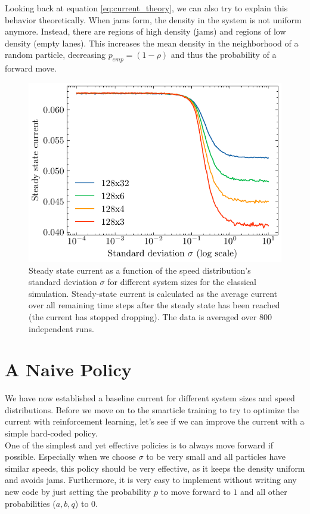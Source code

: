 Looking back at equation \ref{eq:current_theory}, we can also try to explain this behavior theoretically. When jams form, the density in the system is not uniform anymore. Instead, there are regions of high density (jams) and regions of low density (empty lanes). This increases the mean density in the neighborhood of a random particle, decreasing $p_{emp}=(1-\rho)$ and thus the probability of a forward move.  

\begin{figure}[H]
    \centering
    \includegraphics{steady_state_current_sizes_log.pdf}
    \caption{Steady state current as a function of the speed distribution's standard deviation $\sigma$ for different system sizes for the classical simulation. Steady-state current is calculated as the average current over all remaining time steps after the steady state has been reached (the current has stopped dropping). The data is averaged over 800 independent runs.}
    \label{fig:steady_state_current_sizes_log}
\end{figure}

\section{A Naive Policy}
We have now established a baseline current for different system sizes and speed distributions. Before we move on to the smarticle training to try to optimize the current with reinforcement learning, let's see if we can improve the current with a simple hard-coded policy. 
\\
One of the simplest and yet effective policies is to always move forward if possible. Especially when we choose $\sigma$ to be very small and all particles have similar speeds, this policy should be very effective, as it keeps the density uniform and avoids jams. Furthermore, it is very easy to implement without writing any new code by just setting the probability $p$ to move forward to $1$ and all other probabilities ($a,b,q$) to $0$.


